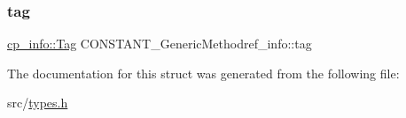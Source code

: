 \mbox{\label{structCONSTANT__GenericMethodref__info_a9ba37a62a4418aa2afd1a93dee802341}} 
\subsubsection{\texorpdfstring{tag}{tag}}
{\footnotesize\ttfamily \hyperlink{structcp__info_acdef8472ed83e12e3a87bca8d6001f69}{cp\+\_\+info\+::\+Tag} C\+O\+N\+S\+T\+A\+N\+T\+\_\+\+Generic\+Methodref\+\_\+info\+::tag}



The documentation for this struct was generated from the following file\+:\begin{DoxyCompactItemize}
\item 
src/\hyperlink{types_8h}{types.\+h}\end{DoxyCompactItemize}
